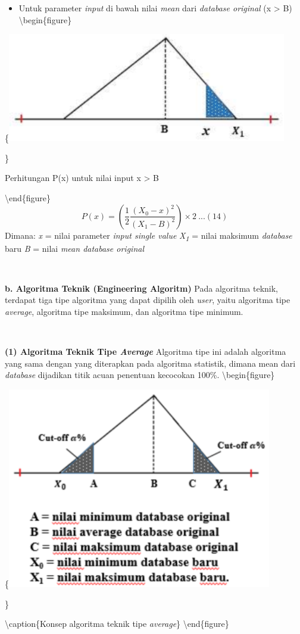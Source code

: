 \documentclass[
]{book}
\providecommand{\tightlist}{%
  \setlength{\itemsep}{0pt}\setlength{\parskip}{0pt}}
\begin{document}
\begin{itemize}
\tightlist
\item
  Untuk parameter \emph{input} di bawah nilai \emph{mean} dari \emph{database original} (x \textgreater{} B)
  \textbackslash begin\{figure\}
\end{itemize}

\{\centering \includegraphics[width=0.5\linewidth]{images/screening/besarB}

\}

\caption{Perhitungan P(x) untuk nilai input x > B}

\label{fig:unnamed-chunk-21}
\textbackslash end\{figure\}
\[P(x) = \left( \frac{1}{2}\frac{(X_0-x)^2}{(X_1-B)^2} \right) \times 2\  ...(14)\]
Dimana:
\emph{x} = nilai parameter \emph{input single value}
\emph{X\textsubscript{1}} = nilai maksimum \emph{database} baru
\emph{B} = nilai \emph{mean database original}

~

\textbf{b. Algoritma Teknik (Engineering Algoritm)}
Pada algoritma teknik, terdapat tiga tipe algoritma yang dapat dipilih oleh \emph{user}, yaitu algoritma tipe \emph{average}, algoritma tipe maksimum, dan algoritma tipe minimum.

~

\textbf{(1) Algoritma Teknik Tipe \emph{Average}}
Algoritma tipe ini adalah algoritma yang sama dengan yang diterapkan pada algoritma statistik, dimana mean dari \emph{database} dijadikan titik acuan penentuan kecocokan 100\%.
\textbackslash begin\{figure\}

\{\centering \includegraphics[width=0.5\linewidth]{images/screening/tipe_average}

\}

\textbackslash caption\{Konsep algoritma teknik tipe \emph{average}\}\label{fig:unnamed-chunk-22}
\textbackslash end\{figure\}
\end{document}
